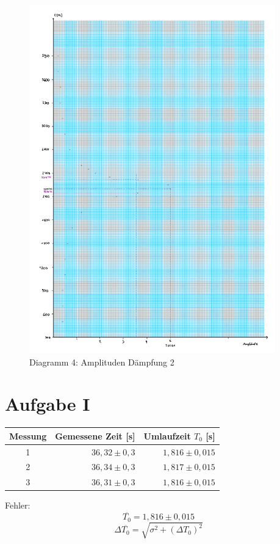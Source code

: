 \begin{figure}[h!]
    \centering
    \includegraphics[page=4, width=0.95\textwidth,]{Dias13.pdf}
    \caption{Diagramm 4: Amplituden Dämpfung 2}
\end{figure}
\newpage

\section{Aufgabe I}

\begin{table}[h!]
    \centering
    \begin{tabular}{c r r}
        \toprule
        Messung & Gemessene Zeit [s] & Umlaufzeit $T_0$ [s] \\
        \midrule
        1 & $36,32 \pm 0,3$ & $ 1,816 \pm 0,015$ \\
        2 & $36,34 \pm 0,3$ & $ 1,817 \pm 0,015$ \\
        3 & $36,31 \pm 0,3$ & $ 1,816 \pm 0,015$ \\
        \bottomrule
    \end{tabular}
\end{table}
Fehler:
\[\boxed{\overline{T_0} = 1,816 \pm 0,015}\]
\begin{equation}
    \Delta \overline{T_0} = \sqrt{\sigma^2 + (\Delta T_0)^2}
\end{equation}


